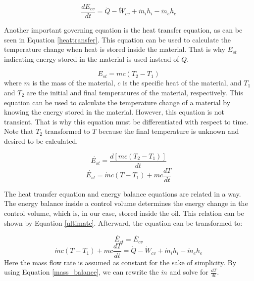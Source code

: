 	\begin{equation}
		\label{energy2}
		\frac{d E_{cv}}{dt}= \dot{Q} -  \dot{W}_{cv} +\dot{m}_i h_i - \dot{m}_e h_e
	\end{equation}
	
	Another important governing equation is the heat transfer equation, as can be seen in Equation \ref{heattransfer}. This equation can be used to calculate the temperature change when heat is stored inside the material. That is why $E_{st}$ indicating energy stored in the material is used instead of $Q$.
 
	\begin{equation}
		\label{heattransfer}
		E_{st}= m c (T_2 - T_1)
	\end{equation}
	\noindent
	where $m$ is the mass of the material, $c$ is the specific heat of the material, and $T_1$ and $T_2$ are the initial and final temperatures of the material, respectively. This equation can be used to calculate the temperature change of a material by knowing the energy stored in the material. However, this equation is not transient. That is why this equation must be differentiated with respect to time. Note that $T_2$ transformed to $T$ because the final temperature is unknown and desired to be calculated.
 
	\begin{equation}
		\label{heattransfer2}
		\dot{E_{st}}= \frac{d[m c (T_2 - T_1)]}{dt}
	\end{equation}
	\begin{equation}
		\label{heattransfer3}
		\dot{E_{st}}= \dot{m} c (T - T_1) + m c \frac{dT}{dt}
	\end{equation}

	The heat transfer equation and energy balance equations are related in a way. The energy balance inside a control volume determines the energy change in the control volume, which is, in our case, stored inside the oil. This relation can be shown by Equation \ref{ultimate}. Afterward, the equation can be transformed to:
 
	\begin{equation}
		\label{ultimate}
		\dot{E_{st}}= \dot{E_{cv}}
	\end{equation}
	\begin{equation}
		\label{ultimate2}
		\dot{m} c (T - T_1) + m c \frac{dT}{dt} = \dot{Q} -  \dot{W}_{cv} +\dot{m}_i h_i - \dot{m}_e h_e
	\end{equation}
	\noindent
	Here the mass flow rate is assumed as constant for the sake of simplicity. By using Equation \ref{mass_balance}, we can rewrite the $\dot{m}$ and solve for $\frac{dT}{dt}$.
 
